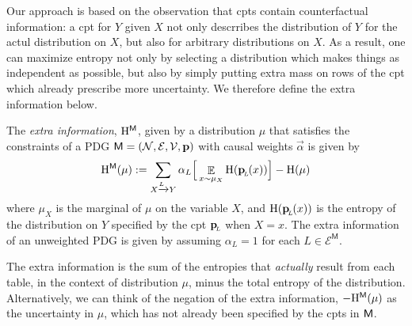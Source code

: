 \documentclass{article}
\newcommand{\bp}[1][L]{\mat{p}_{\!_#1\!}}
\newcommand{\Ed}{\mathcal E}
\newcommand{\sfM}{\mathsf M}
\newcommand{\alle}[1][L]{_{ X \xrightarrow{\!\!#1} Y }}
\numberwithin{equation}{section}
\begin{document}
Our approach is based on the observation that cpts contain
counterfactual information:  
	a cpt for $Y$ given $X$ not only descrribes the distribution of $Y$
        for the actul distribution on $X$, but also for
        arbitrary distributions on $X$.
        As a result, one can maximize
        entropy not only by selecting a distribution which makes
        things as independent as possible, but also by simply putting
        extra mass on rows of the cpt which already prescribe more
        uncertainty. We therefore define the extra information below. 
	
	\begin{defn}\label{def:extra}
		The \emph{extra information}, $\H^{\sfM}$, given by a distribution $\mu$ that satisfies the constraints of a PDG $\sfM = \mnvars[]$ with causal weights $\vec \alpha$ is given by
		\[ \H^{\sfM}(\mu) := \sum\alle \alpha_L \Big[ \E_{x \sim \mu_X}  \H (\bp (x))  \Big] - \H(\mu) \] 
		where $\mu_X$ is the marginal of $\mu$ on the variable $X$, and $\H(\bp(x))$ is the entropy of the distribution on $Y$ specified by the cpt $\bp$ when $X = x$. The extra information of an unweighted PDG is given by assuming $\alpha_L = 1$ for each $L \in \Ed^\sfM$.
	\end{defn}
	The extra information is the sum of the entropies that \emph{actually} result from each table, in the context of distribution $\mu$, minus the total entropy of the distribution.
	Alternatively, we can think of the negation of the extra
        information, $-\H^\sfM(\mu)$ as the uncertainty in $\mu$,
        which has not already been specified by the cpts in $\sf M$.
\end{document}
